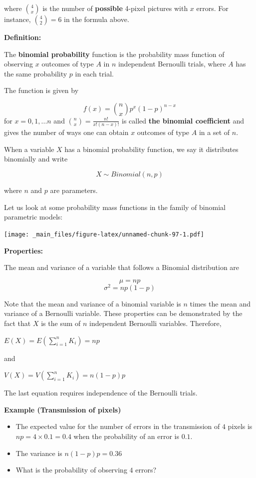 \documentclass[
]{book}
\begin{document}
where \(\binom 4 x\) is the number of \textbf{possible} 4-pixel pictures with \(x\) errors. For instance, \(\binom 4 2=6\) in the formula above.

\textbf{Definition:}

The \textbf{binomial probability} function is the probability mass function of observing \(x\) outcomes of type \(A\) in \(n\) independent Bernoulli trials, where \(A\) has the same probability \(p\) in each trial.

The function is given by

\[f(x)=\binom n x p^x(1-p)^{n-x}\]
for \(x=0,1,...n\) and \(\binom n x= \frac{n!}{x!(n-x)!}\) is called \textbf{the binomial coefficient} and gives the number of ways one can obtain \(x\) outcomes of type \(A\) in a set of \(n\).

When a variable \(X\) has a binomial probability function, we say it distributes binomially and write

\[X\sim Binomial(n,p)\]

where \(n\) and \(p\) are parameters.

Let us look at some probability mass functions in the family of binomial parametric models:

\texttt{[image: \_main\_files/figure-latex/unnamed-chunk-97-1.pdf]}

\textbf{Properties:}

The mean and variance of a variable that follows a Binomial distribution are

\[\mu=np\]
\[\sigma^2=np(1-p)\]

Note that the mean and variance of a binomial variable is \(n\) times the mean and variance of a Bernoulli variable. These properties can be demonstrated by the fact that \(X\) is the sum of \(n\) independent Bernoulli variables. Therefore,

\(E(X)=E(\sum_{i=1}^n K_i)=np\)

and

\(V(X)=V(\sum_{i=1}^n K_i)=n(1-p)p\)

The last equation requires independence of the Bernoulli trials.

\textbf{Example (Transmission of pixels)}

\begin{itemize}
\item
  The expected value for the number of errors in the transmission of \(4\) pixels is \(np=4\times 0.1=0.4\) when the probability of an error is \(0.1\).
\item
  The variance is \(n(1-p)p=0.36\)
\item
  What is the probability of observing \(4\) errors?
\end{itemize}
\end{document}

